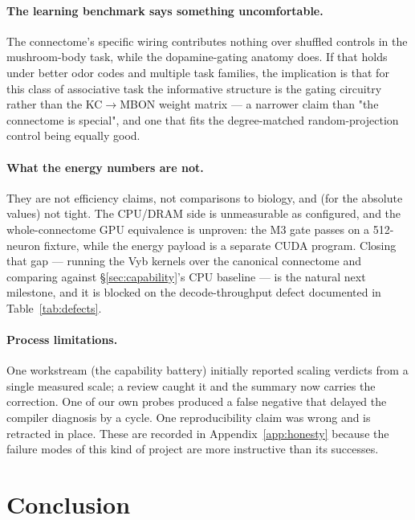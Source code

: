 \documentclass[11pt,a4paper]{article}
\begin{document}
\paragraph{The learning benchmark says something uncomfortable.}
The connectome's specific wiring contributes nothing over shuffled controls in the mushroom-body
task, while the dopamine-gating anatomy does. If that holds under better odor codes and multiple
task families, the implication is that for this class of associative task the informative
structure is the gating circuitry rather than the KC$\to$MBON weight matrix --- a narrower claim
than "the connectome is special", and one that fits the degree-matched random-projection control
being equally good.

\paragraph{What the energy numbers are not.}
They are not efficiency claims, not comparisons to biology, and (for the absolute values) not
tight. The CPU/DRAM side is unmeasurable as configured, and the whole-connectome GPU equivalence
is unproven: the M3 gate passes on a 512-neuron fixture, while the energy payload is a separate
CUDA program. Closing that gap --- running the Vyb kernels over the canonical connectome and
comparing against \S\ref{sec:capability}'s CPU baseline --- is the natural next milestone, and it
is blocked on the decode-throughput defect documented in Table~\ref{tab:defects}.

\paragraph{Process limitations.}
One workstream (the capability battery) initially reported scaling verdicts from a single measured
scale; a review caught it and the summary now carries the correction. One of our own probes
produced a false negative that delayed the compiler diagnosis by a cycle. One reproducibility
claim was wrong and is retracted in place. These are recorded in Appendix~\ref{app:honesty}
because the failure modes of this kind of project are more instructive than its successes.

\FloatBarrier
\section{Conclusion}
\label{sec:conclusion}
\end{document}
